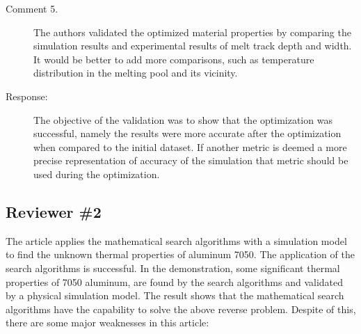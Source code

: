 \documentclass{article}
\begin{document}
\begin{description}
 	\item[Comment 5.] The authors validated the optimized material properties by comparing the simulation results and experimental results of melt track depth and width. It would be better to add more comparisons, such as temperature distribution in the melting pool and its vicinity.
 	\item[Response:] The objective of the validation was to show that the optimization was successful, namely the results were more accurate after the optimization when compared to the initial dataset.  If another metric is deemed a more precise representation of accuracy of the simulation that metric should be used during the optimization.
\end{description}

\subsection*{Reviewer \#2} The article applies the mathematical search algorithms with a simulation model to find the unknown thermal properties of aluminum 7050.
The application of the search algorithms is successful. In the demonstration, some significant thermal properties of 7050 aluminum, are found by the search algorithms and validated by a physical simulation model. The result shows that the mathematical search algorithms have the capability to solve the above reverse problem.
Despite of this, there are some major weaknesses in this article:
\end{document}
